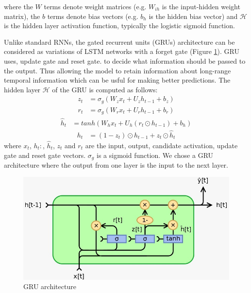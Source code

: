 \documentclass[10pt,twocolumn,letterpaper]{article}
\begin{document}
where the $W$ terms denote weight matrices (e.g. $W_{ih}$ is the input-hidden weight matrix), the $b$ terms denote bias vectors (e.g. $b_{h}$ is the hidden bias vector) and $\mathcal{H}$ is the hidden layer activation function, typically the logistic sigmoid function.

Unlike standard RNNs, the gated recurrent units (GRUs) architecture can be considered as variations of LSTM networks with a forget gate (Figure \ref{fig:GRU}). GRU uses, update gate and reset gate. to decide what information should be passed to the output. Thus allowing the model to retain information about long-range temporal information which can be usful for making better predictions. The hidden layer $\mathcal{H}$ of the GRU is computed as follows:
\begin{equation}
    \begin{aligned}
        z_{t} &=\sigma_{g}\left(W_{z} x_{t}+U_{z} h_{t-1}+b_{z}\right)
    \end{aligned}
\end{equation}
\begin{equation}
    \begin{aligned}
        r_{t} &=\sigma_{g}\left(W_{r} x_{t}+U_{r} h_{t-1}+b_{r}\right)
    \end{aligned}
\end{equation}
\begin{equation}
    \begin{aligned}
        \hat{h}_{t} &= tanh\left(W_{h} x_{t}+U_{h}\left(r_{t} \odot h_{t-1}\right)+b_{h}\right)
    \end{aligned}
\end{equation}
\begin{equation}
    \begin{aligned}
        h_{t} &=\left(1-z_{t}\right) \odot h_{t-1}+z_{t} \odot \hat{h}_{t}
    \end{aligned}
\end{equation}
where $x_{t}$, $h_{t}:$, $\hat{h}_{t}$, $z_{t}$ and $r_{t}$ are the input, output, candidate activation, update gate and reset gate vectors. $\sigma_{g}$ is a sigmoid function. We chose a GRU architecture where the output from one layer is the input to the next layer.

\begin{figure}
    \centering
    \includegraphics[scale=0.25]{./Images/GRU.png}
    \caption{GRU architecture}
    \label{fig:GRU}
\end{figure}
\end{document}
